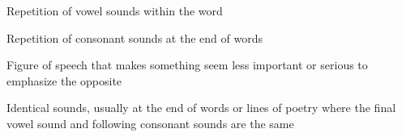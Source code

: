 \begin{definition}[Assonance]
  Repetition of vowel sounds within the word
\end{definition}

\begin{definition}[Consonance]
  Repetition of consonant sounds at the end of words
\end{definition}

\begin{definition}[Understatement]
  Figure of speech that makes something seem less important or serious to
  emphasize the opposite
\end{definition}

\begin{definition}[Rhyme]
  Identical sounds, usually at the end of words or lines of poetry where the
  final vowel sound and following consonant sounds are the same
\end{definition}


\newpage
